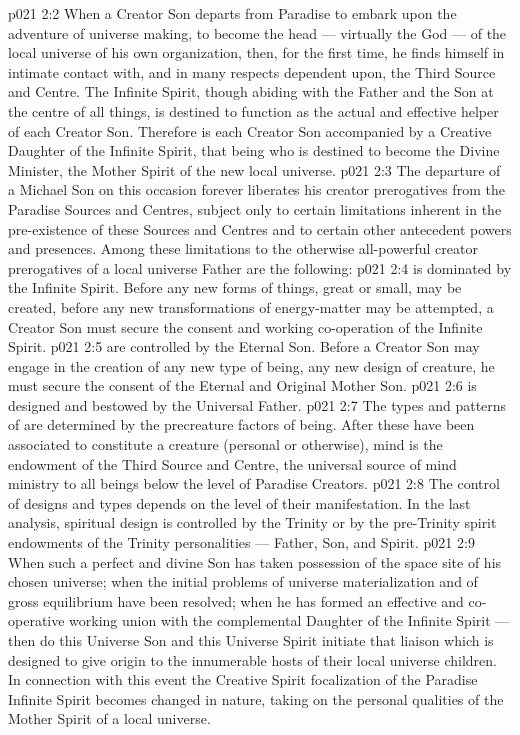 \vs p021 2:2 \pc When a Creator Son departs from Paradise to embark upon the adventure of universe making, to become the head --- virtually the God --- of the local universe of his own organization, then, for the first time, he finds himself in intimate contact with, and in many respects dependent upon, the Third Source and Centre. The Infinite Spirit, though abiding with the Father and the Son at the centre of all things, is destined to function as the actual and effective helper of each Creator Son. Therefore is each Creator Son accompanied by a Creative Daughter of the Infinite Spirit, that being who is destined to become the Divine Minister, the Mother Spirit of the new local universe.
\vs p021 2:3 The departure of a Michael Son on this occasion forever liberates his creator prerogatives from the Paradise Sources and Centres, subject only to certain limitations inherent in the pre\hyp{}existence of these Sources and Centres and to certain other antecedent powers and presences. Among these limitations to the otherwise all\hyp{}powerful creator prerogatives of a local universe Father are the following:
\vs p021 2:4 \bibnobreakspace {} is dominated by the Infinite Spirit. Before any new forms of things, great or small, may be created, before any new transformations of energy\hyp{}matter may be attempted, a Creator Son must secure the consent and working co\hyp{}operation of the Infinite Spirit.
\vs p021 2:5 \bibnobreakspace {} are controlled by the Eternal Son. Before a Creator Son may engage in the creation of any new type of being, any new design of creature, he must secure the consent of the Eternal and Original Mother Son.
\vs p021 2:6 \bibnobreakspace {} is designed and bestowed by the Universal Father.
\vs p021 2:7 \pc The types and patterns of  are determined by the precreature factors of being. After these have been associated to constitute a creature (personal or otherwise), mind is the endowment of the Third Source and Centre, the universal source of mind ministry to all beings below the level of Paradise Creators.
\vs p021 2:8 \pc The control of  designs and types depends on the level of their manifestation. In the last analysis, spiritual design is controlled by the Trinity or by the pre\hyp{}Trinity spirit endowments of the Trinity personalities --- Father, Son, and Spirit.
\vs p021 2:9 \pc When such a perfect and divine Son has taken possession of the space site of his chosen universe; when the initial problems of universe materialization and of gross equilibrium have been resolved; when he has formed an effective and co\hyp{}operative working union with the complemental Daughter of the Infinite Spirit --- then do this Universe Son and this Universe Spirit initiate that liaison which is designed to give origin to the innumerable hosts of their local universe children. In connection with this event the Creative Spirit focalization of the Paradise Infinite Spirit becomes changed in nature, taking on the personal qualities of the Mother Spirit of a local universe.
